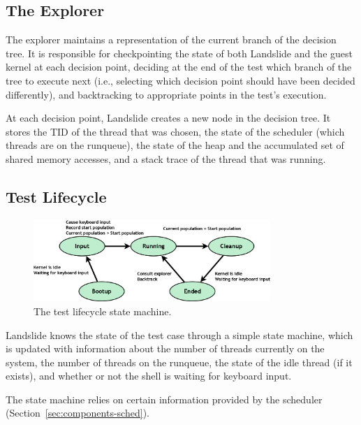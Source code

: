 \subsection{The Explorer}
\label{sec:components-explore}

The explorer maintains a representation of the current branch of the decision tree. It is responsible for checkpointing the state of both Landslide and the guest kernel at each decision point, deciding at the end of the test which branch of the tree to execute next (i.e., selecting which decision point should have been decided differently), and backtracking to appropriate points in the test's execution.

At each decision point, Landslide creates a new node in the decision tree. It stores the TID of the thread that was chosen, the state of the scheduler (which threads are on the runqueue), the state of the heap and the accumulated set of shared memory accesses, and a stack trace of the thread that was running.

\subsection{Test Lifecycle}
\label{sec:components-test}

\begin{figure}[h]
	\begin{center}
		\includegraphics[width=0.8\textwidth]{teststate.png}
	\end{center}
	\caption{The test lifecycle state machine.}
	\label{fig:teststate}
\end{figure}
Landslide knows the state of the test case through a simple state machine, which is updated with information about the number of threads currently on the system, the number of threads on the runqueue, the state of the idle thread (if it exists), and whether or not the shell is waiting for keyboard input.

The state machine relies on certain information provided by the scheduler (Section~\ref{sec:components-sched}).

